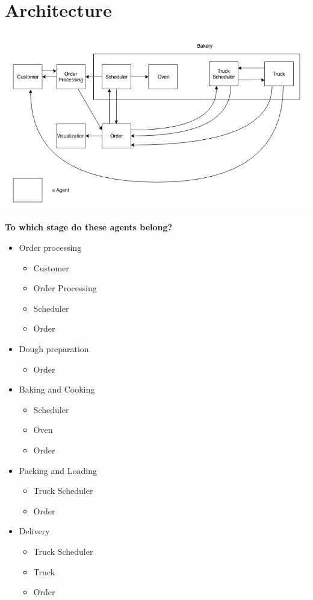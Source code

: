 \section{Architecture}
	\includegraphics[scale=0.7]{./images/architecture.jpg}
	
\newpage
\textbf{ To which stage do these agents belong?}
{\small 
\begin{itemize}
	\item Order processing
	\begin{itemize}
		\item Customer
		\item Order Processing
		\item Scheduler
		\item Order
	\end{itemize}
	\item Dough preparation
	\begin{itemize}
		\item Order
	\end{itemize}
	\item Baking and Cooking
	\begin{itemize}
		\item Scheduler
		\item Oven
		\item Order
	\end{itemize}
	\item Packing and Loading
	\begin{itemize}
		\item Truck Scheduler
		\item Order
	\end{itemize}
	\item Delivery
	\begin{itemize}
		\item Truck Scheduler
		\item Truck
		\item Order
	\end{itemize}
\end{itemize}}
 
